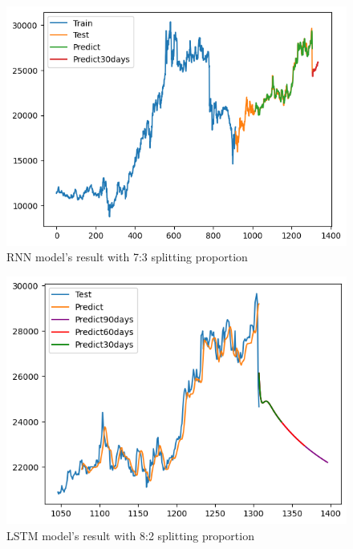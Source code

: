 \documentclass{ieeeojies}
\begin{document}
\begin{figure}[H]
  \centering
  \begin{minipage}{0.6\linewidth}
    \centering
    \includegraphics[width=\linewidth]{bibliography/diagram/RNN-ACB.png}
    \caption{RNN model’s result with 7:3 splitting proportion}
    \label{fig8}
  \end{minipage}
\end{figure}

\begin{figure}[H]
  \centering
  \begin{minipage}{0.6\linewidth}
    \centering
    \includegraphics[width=\linewidth]{bibliography/diagram/LSTM-ACB.png}
    \caption{LSTM model’s result with 8:2 splitting proportion}
    \label{fig8}
  \end{minipage}
\end{figure}
\end{document}
